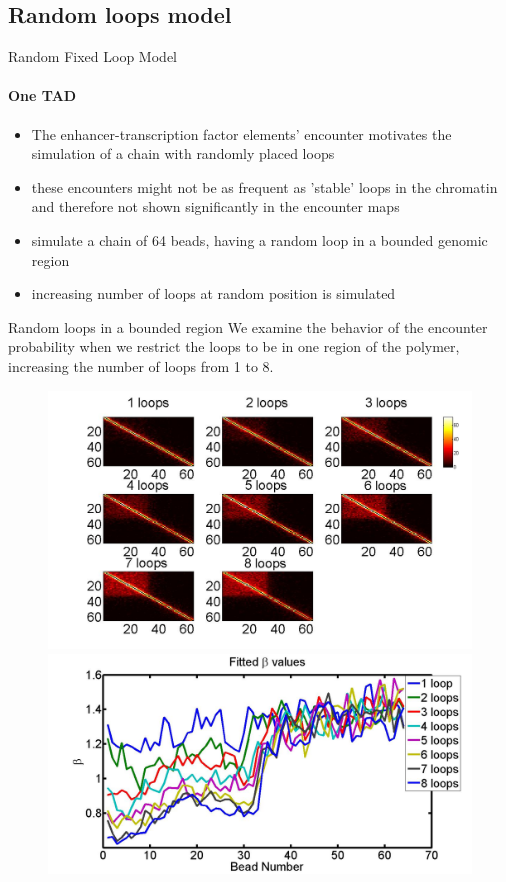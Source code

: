 \documentclass[8pt]{beamer}
\begin{document}
\subsection{Random loops model}\label{subsection_randomLoopsModel}
\begin{frame}{Random Fixed Loop Model}
\framesubtitle{One TAD}
\begin{itemize}
\item The enhancer-transcription factor elements' encounter motivates the simulation of a chain with randomly placed loops
\item these encounters might not be as frequent as 'stable' loops in the chromatin and therefore not shown significantly in the encounter maps
\item simulate a chain of 64 beads, having a random loop in a bounded genomic region
\item increasing number of loops at random position is simulated 
\end{itemize}

\end{frame}

\begin{frame}{Random loops in a bounded region }
We examine the behavior of the encounter probability when we restrict the loops to be in one region of the polymer, increasing the number of loops from 1 to 8.
\begin{figure}[H]
\includegraphics[scale=0.13]{encounterHistogramOneTAD_1to8Loops}
\includegraphics[scale=0.13]{fittedExpOneTAD1To8Loops}
\end{figure}
\end{frame}
\end{document}
